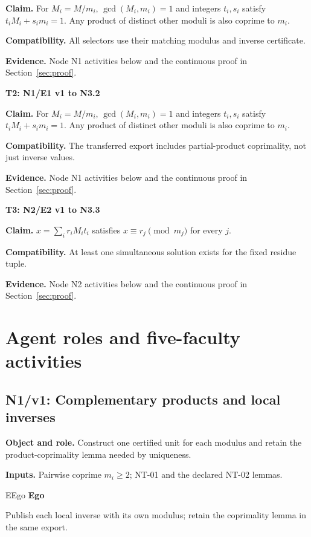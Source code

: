 \documentclass[preprint,12pt,aps,pra,showkeys,amsmath,amssymb,superscriptaddress,floatfix]{revtex4-2}
\theoremstyle{definition}
\theoremstyle{remark}
\newcommand{\mmfaculty}[3]{%
 \begin{mmfacultybox}{#1}{#2}
 {\sffamily\bfseries\color{MMBlue}#2}\par\smallskip #3
 \end{mmfacultybox}}
\newcommand{\field}[2]{\par\smallskip\noindent\textbf{#1.} #2\par}
\begin{document}
\field{Claim}{For \(M_i=M/m_i\), \(\gcd(M_i,m_i)=1\) and integers \(t_i,s_i\) satisfy
\(t_iM_i+s_im_i=1\). Any product of distinct other moduli is also
coprime to \(m_i\).}

\field{Compatibility}{All selectors use their matching modulus and inverse certificate.}

\field{Evidence}{Node N1 activities below and the continuous proof in Section~\ref{sec:proof}.}

\smallskip\noindent\textbf{T2: N1/E1 v1 to N3.2}

\field{Claim}{For \(M_i=M/m_i\), \(\gcd(M_i,m_i)=1\) and integers \(t_i,s_i\) satisfy
\(t_iM_i+s_im_i=1\). Any product of distinct other moduli is also
coprime to \(m_i\).}

\field{Compatibility}{The transferred export includes partial-product coprimality, not just
inverse values.}

\field{Evidence}{Node N1 activities below and the continuous proof in Section~\ref{sec:proof}.}

\smallskip\noindent\textbf{T3: N2/E2 v1 to N3.3}

\field{Claim}{\(x=\sum_i r_iM_it_i\) satisfies \(x\equiv r_j\pmod{m_j}\) for every
\(j\).}

\field{Compatibility}{At least one simultaneous solution exists for the fixed residue tuple.}

\field{Evidence}{Node N2 activities below and the continuous proof in Section~\ref{sec:proof}.}

\endgroup

\clearpage\section{Agent roles and five-faculty activities}

\subsection{N1/v1: Complementary products and local inverses}

\field{Object and role}{Construct one certified unit for each modulus and retain the
product-coprimality lemma needed by uniqueness.}

\field{Inputs}{Pairwise coprime \(m_i\ge2\); NT-01 and the declared NT-02 lemmas.}

\mmfaculty{E}{Ego}{Publish each local inverse with its own modulus; retain the coprimality
lemma in the same export.}
\end{document}
